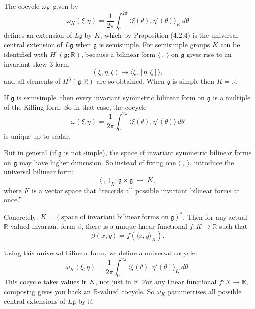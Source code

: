 \documentclass[12pt]{article}
\begin{document}
The cocycle $\omega_K$ given by
\begin{equation} \label{eq:4.2.7}
    \omega_K(\xi,\eta) = \frac{1}{2\pi} \int_0^{2\pi}
    \langle \xi(\theta), \eta'(\theta)\rangle_K \, d\theta
\end{equation}
defines an extension of $L\mathfrak{g}$ by $K$, which by Proposition (4.2.4) is the
universal central extension of $L\mathfrak{g}$ when $\mathfrak{g}$ is semisimple.
For semisimple groups $K$ can be identified with $H^3(\mathfrak{g};\mathbb{R})$,
because a bilinear form $\langle \ , \ \rangle$ on $\mathfrak{g}$ gives rise to an
invariant skew $3$-form
\[
    (\xi,\eta,\zeta) \mapsto \langle \xi,[\eta,\zeta]\rangle,
\]
and all elements of $H^3(\mathfrak{g};\mathbb{R})$ are so obtained. When $\mathfrak{g}$ is simple then $K = \mathbb{R}$.

\begin{remark}
    If $\mathfrak{g}$ is semisimple, then every invariant symmetric bilinear form on $\mathfrak{g}$ is a multiple of the Killing form. So in that case, the cocycle
    \[
        \omega(\xi,\eta) = \frac{1}{2\pi}\int_0^{2\pi} \langle \xi(\theta), \eta'(\theta)\rangle \, d\theta
    \]
    is unique up to scalar.

    But in general (if $\mathfrak{g}$ is not simple), the space of invariant symmetric bilinear forms on $\mathfrak{g}$ may have higher dimension. So instead of fixing one $\langle\ ,\ \rangle$, introduce the universal bilinear form:
    \[
        \langle\ ,\ \rangle_K : \mathfrak{g} \times \mathfrak{g} \;\to\; K,
    \]
    where $K$ is a vector space that “records all possible invariant bilinear forms at once.”

    Concretely: $K = (\text{space of invariant bilinear forms on }\mathfrak{g})^*$.
    Then for any actual $\mathbb{R}$-valued invariant form $\beta$, there is a unique linear functional $f:K\to \mathbb{R}$ such that
    \[
        \beta(x,y) = f(\langle x,y\rangle_K).
    \]


    Using this universal bilinear form, we define a universal cocycle:
    \[
        \omega_K(\xi,\eta) = \frac{1}{2\pi}\int_0^{2\pi} \langle \xi(\theta), \eta'(\theta)\rangle_K \, d\theta.
    \]
    This cocycle takes values in $K$, not just in $\mathbb{R}$. For any linear functional $f:K\to \mathbb{R}$, composing gives you back an $\mathbb{R}$-valued cocycle. So $\omega_K$ parametrizes all possible central extensions of $L\mathfrak{g}$ by $\mathbb{R}$.
\end{remark}
\end{document}
